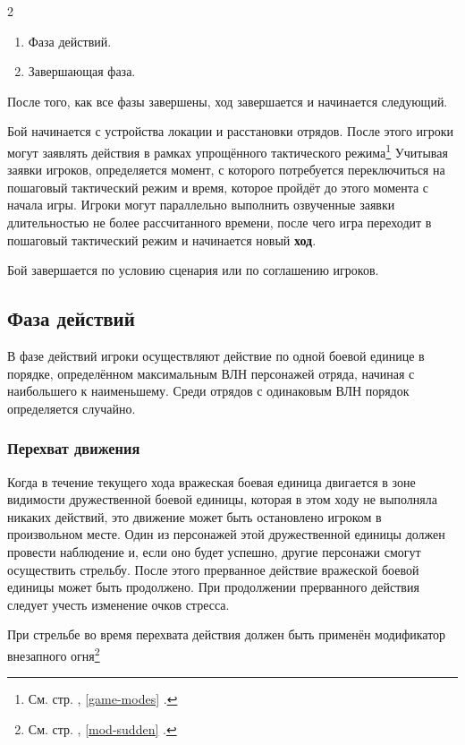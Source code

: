 \documentclass[twoside]{article}
\begin{document}
\begin{multicols}{2}
\begin{enumerate}
\def\labelenumi{\arabic{enumi}.}
\item
  Фаза действий.
\item
  Завершающая фаза.
\end{enumerate}

После того, как все фазы завершены, ход завершается и начинается
следующий.

Бой начинается с устройства локации и расстановки отрядов. После этого
игроки могут заявлять действия в рамках упрощённого тактического
режима\footnote{См. стр. \pageref{game-modes}, \ref{game-modes} .} Учитывая заявки игроков, определяется момент, с которого
потребуется переключиться на пошаговый тактический режим и время,
которое пройдёт до этого момента с начала игры. Игроки могут параллельно
выполнить озвученные заявки длительностью не более рассчитанного
времени, после чего игра переходит в пошаговый тактический режим и
начинается новый \textbf{ход}.

Бой завершается по условию сценария или по соглашению игроков.

\subsection{Фаза действий}\label{action-phase}

В фазе действий игроки осуществляют действие по одной боевой единице в
порядке, определённом максимальным ВЛН персонажей отряда, начиная
с наибольшего к наименьшему. Среди отрядов с одинаковым ВЛН
порядок определяется случайно.

\subsubsection{Перехват движения}\label{intercept}

Когда в течение текущего хода вражеская боевая единица двигается в зоне
видимости дружественной боевой единицы, которая в этом ходу не выполняла
никаких действий, это движение может быть остановлено игроком в
произвольном месте. Один из персонажей этой дружественной единицы должен
провести наблюдение и, если оно будет успешно, другие персонажи смогут
осуществить стрельбу. После этого прерванное действие вражеской боевой
единицы может быть продолжено. При продолжении прерванного действия
следует учесть изменение очков стресса.

При стрельбе во время перехвата действия должен быть применён
модификатор внезапного огня\footnote{См. стр. \pageref{mod-sudden}, \ref{mod-sudden} .}


\end{multicols}
\end{document}
